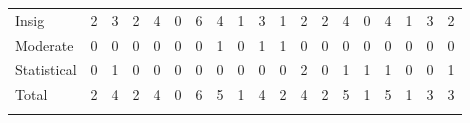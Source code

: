 \begin{tabular}{lcccccccccccccccccc}
\hline \noalign{\smallskip}Insig & 2 & 3 & 2 & 4 & 0 & 6 & 4 & 1 & 3 & 1 & 2 & 2 & 4 & 0 & 4 & 1 & 3 & 2\\
Moderate & 0 & 0 & 0 & 0 & 0 & 0 & 1 & 0 & 1 & 1 & 0 & 0 & 0 & 0 & 0 & 0 & 0 & 0\\
Statistical & 0 & 1 & 0 & 0 & 0 & 0 & 0 & 0 & 0 & 0 & 2 & 0 & 1 & 1 & 1 & 0 & 0 & 1\\
Total & 2 & 4 & 2 & 4 & 0 & 6 & 5 & 1 & 4 & 2 & 4 & 2 & 5 & 1 & 5 & 1 & 3 & 3\\
\noalign{\smallskip}\hline\end{tabular}\\
